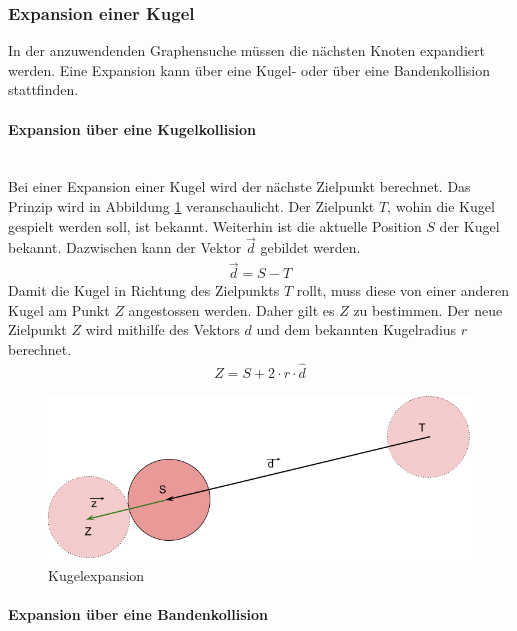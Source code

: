 \subsubsection{Expansion einer Kugel}
In der anzuwendenden Graphensuche müssen die nächsten Knoten expandiert werden.
Eine Expansion kann über eine Kugel- oder über eine Bandenkollision stattfinden.

\paragraph{Expansion über eine Kugelkollision}\mbox{}\\

Bei einer Expansion einer Kugel wird der nächste Zielpunkt berechnet.
Das Prinzip wird in Abbildung \ref{fig:kugelexpansion} veranschaulicht.
Der Zielpunkt $T$, wohin die Kugel gespielt werden soll, ist bekannt.
Weiterhin ist die aktuelle Position $S$ der Kugel bekannt. Dazwischen kann der Vektor $\vec{d}$ gebildet werden.
\begin{align}
    \vec{d} = S - T
\end{align}
Damit die Kugel in Richtung des Zielpunkts $T$ rollt, muss diese von einer anderen Kugel am Punkt $Z$ angestossen werden.
Daher gilt es $Z$ zu bestimmen.
Der neue Zielpunkt $Z$ wird mithilfe des Vektors $d$ und dem bekannten Kugelradius $r$ berechnet.
\begin{align}
    Z = S + 2 \cdot r \cdot \hat{d}
\end{align}

\begin{figure}[h!]
    \begin{center}
        \includegraphics[width=0.5\linewidth]{../common/03_billiard_ai/resources/35_suchkandidat_kugel_expand.png}
    \end{center}
    \caption{Kugelexpansion}
    \label{fig:kugelexpansion}
\end{figure}

\paragraph{Expansion über eine Bandenkollision}\label{kandidatensuche:bandenkollisionstheorie}\mbox{}\\

